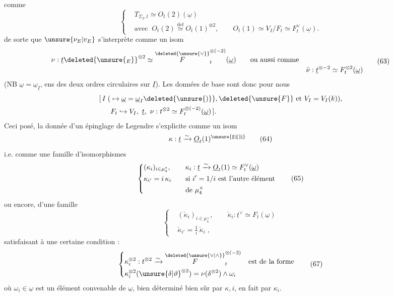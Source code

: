 comme
\[
\left\{\begin{aligned}
&T_{\Sigma_I,t}\simeq O_t(2)(\underline\omega)\\
&\text{avec }\ O_t(2)\overset{\mathrm{def}}{\simeq}O_t(1)^{\otimes2},\qquad
O_t(1)\simeq V_I/F_t\simeq F_t^\vee(\underline\omega).
\end{aligned}\right. \tag*{(62)}
\]
de sorte que $\unsure{\nu_E|v_E}$ s'interprète comme un isom
\[
\begin{aligned}
\nu:\underline t\deleted{\unsure{_E}}^{\otimes2}&\simeq
\overset{\deleted{\unsure{\vee}}}{F}_t^{\otimes(-2)}(\underline\omega)
\qquad\text{ou aussi comme}\\[-2pt]
&&\check\nu:\underline t^{\otimes-2}\simeq F_t^{\otimes2}(\underline\omega)
\end{aligned}\tag*{(63)}
\]
(NB $\underline\omega=\underline\omega_{\underline I}$, ens des deux ordres circulaires sur $\underline I$). Les données de base sont donc pour nous
\[
\begin{aligned}
[\,I\;(&\mapsto\underline\omega=\underline\omega_I\deleted{\unsure{)}},\deleted{\unsure{F}}\text{ et }V_I=V_I(k)),\\
&F_t\hookrightarrow V_I,\ \underline t,\ \nu:t^{\otimes2}\simeq F_t^{\otimes(-2)}(\underline\omega)\,].
\end{aligned}
\]
Ceci posé, la donnée d'un épinglage de Legendre s'explicite comme un isom
\[
\kappa:\underline t\xrightarrow{\sim}\underline O_t(1)^{\unsure{\sharp|\xi|\natural}} \tag*{(64)}
\]
i.e. comme une famille d'isomorphismes
\[
\left\{\begin{aligned}
&(\kappa_i)_{i\in\mu_4^*},\qquad
\kappa_i:\underline t\xrightarrow{\sim}\underline O_t(1)\simeq F_t^\vee(\underline\omega)\\
&\kappa_{i'}=i\,\kappa_i\qquad\text{si }i'=1/i\text{ est l'autre élément}\\
&\hphantom{\kappa_{i'}=i\,\kappa_i\qquad}\text{de }\mu_4^\times
\end{aligned}\right. \tag*{(65)}
\]
ou encore, d'une famille
\[
\left\{\begin{aligned}
&(\check\kappa_i)_{i\in\mu_4^\times},\qquad \check\kappa_i:\underline t^\vee\simeq F_t(\underline\omega)\\
&\check\kappa_{i'}=\frac1i\,\check\kappa_i\;,
\end{aligned}\right. \tag*{(66)}
\]
satisfaisant à une certaine condition :
\[
\left\{\begin{aligned}
&\kappa_i^{\otimes2}:t^{\otimes2}\xrightarrow{\sim}\overset{\deleted{\unsure{\vee|\wedge}}}{F}_t^{\otimes(-2)}
\quad\text{est de la forme}\\
&\kappa_i^{\otimes2}(\unsure{\delta|\vartheta}^{\otimes2})=\nu(\delta^{\otimes2})\mathbin{\wedge}\omega_i
\end{aligned}\right. \tag*{(67)}
\]
où $\omega_i\in\underline\omega$ est un élément convenable de $\underline\omega$, bien déterminé bien sûr par $\kappa,i$, en fait par $\kappa_i$.
